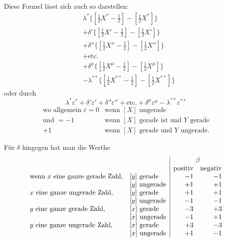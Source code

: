 Diese Formel lässt sich auch so darstellen:
\[
\begin{aligned}
&\lambda^*\{[\tfrac12X^*-\tfrac12]-[\tfrac12X^*]\}\\
&+\delta'\{[\tfrac12X'-\tfrac12]-[\tfrac12X']\}\\
&+\delta''\{[\tfrac12X''-\tfrac12]-[\tfrac12X'']\}\\
&+\text{etc.}\\
&+\delta^\mu\{[\tfrac12X^\mu-\tfrac12]-[\tfrac12X^\mu]\}\\
&-\lambda^{**}\{[\tfrac12X^{**}-\tfrac12]-[\tfrac12X^{**}]\}
\end{aligned}
\]
oder durch
\[
\lambda^*\varepsilon^*+\delta'\varepsilon'+\delta''\varepsilon''+\text{etc.}+\delta^\mu\varepsilon^\mu-\lambda^{**}\varepsilon^{**}
\]
\[
\begin{array}{rll}
\text{wo allgemein }\varepsilon=0&\text{wenn }[X]\text{ ungerade}\\
\text{und }=-1&\text{wenn }[X]\text{ gerade ist und }Y\text{ gerade}\\
+1&\text{wenn }[X]\text{ gerade und }Y\text{ ungerade.}
\end{array}
\]

Für $\delta$ hingegen hat man die Werthe
\[
\begin{array}{ll|rr}
&&\multicolumn{2}{c}{\beta}\\
&&\text{positiv}&\text{negativ}\\
\text{wenn }x\text{ eine ganze gerade Zahl,}&[y]\text{ gerade}&-1&-1\\
&[y]\text{ ungerade}&+1&+1\\
x\text{ eine ganze ungerade Zahl,}&[y]\text{ gerade}&+1&+1\\
&[y]\text{ ungerade}&-1&-1\\
y\text{ eine ganze gerade Zahl,}&[x]\text{ gerade}&-3&+3\\
&[x]\text{ ungerade}&-1&+1\\
y\text{ eine ganze ungerade Zahl,}&[x]\text{ gerade}&+3&-3\\
&[x]\text{ ungerade}&+1&-1
\end{array}
\]

